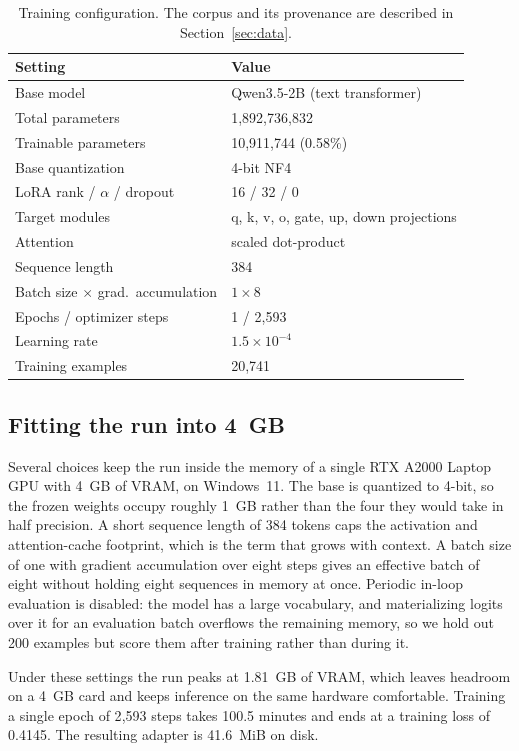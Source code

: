 \begin{table}[t]
\centering
\caption{Training configuration. The corpus and its provenance are described in Section~\ref{sec:data}.}
\label{tab:trainconfig}
\begin{tabular}{ll}
\toprule
Setting & Value \\
\midrule
Base model & Qwen3.5-2B (text transformer) \\
Total parameters & 1{,}892{,}736{,}832 \\
Trainable parameters & 10{,}911{,}744 (0.58\%) \\
Base quantization & 4-bit NF4 \\
LoRA rank / $\alpha$ / dropout & 16 / 32 / 0 \\
Target modules & q, k, v, o, gate, up, down projections \\
Attention & scaled dot-product \\
Sequence length & 384 \\
Batch size $\times$ grad.\ accumulation & $1 \times 8$ \\
Epochs / optimizer steps & 1 / 2{,}593 \\
Learning rate & $1.5\times10^{-4}$ \\
Training examples & 20{,}741 \\
\bottomrule
\end{tabular}
\end{table}

\subsection{Fitting the run into 4~GB}
Several choices keep the run inside the memory of a single RTX A2000 Laptop GPU with 4~GB of VRAM, on Windows~11. The base is quantized to 4-bit, so the frozen weights occupy roughly 1~GB rather than the four they would take in half precision. A short sequence length of 384 tokens caps the activation and attention-cache footprint, which is the term that grows with context. A batch size of one with gradient accumulation over eight steps gives an effective batch of eight without holding eight sequences in memory at once. Periodic in-loop evaluation is disabled: the model has a large vocabulary, and materializing logits over it for an evaluation batch overflows the remaining memory, so we hold out 200 examples but score them after training rather than during it.

Under these settings the run peaks at 1.81~GB of VRAM, which leaves headroom on a 4~GB card and keeps inference on the same hardware comfortable. Training a single epoch of 2{,}593 steps takes 100.5 minutes and ends at a training loss of 0.4145. The resulting adapter is 41.6~MiB on disk.

